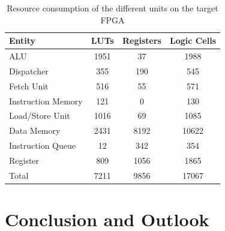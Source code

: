 \documentclass[conference]{IEEEtran}
\begin{document}
\begin{table}
	\caption{Resource consumption of the different units on the target FPGA}
	\centering
	\begin{tabular}{l c c c}
			Entity & LUTs & Registers & Logic Cells \\
		\midrule
			ALU & 1951 & 37 & 1988 \\
			Dispatcher & 355 & 190 & 545 \\
			Fetch Unit & 516 & 55 & 571 \\
			Instruction Memory & 121 & 0 & 130 \\
			Load/Store Unit & 1016 & 69 & 1085 \\
			Data Memory & 2431 & 8192 & 10622 \\
			Instruction Queue & 12 & 342 & 354 \\
			Register & 809 & 1056 & 1865 \\
		\midrule
			Total & 7211 & 9856 & 17067 \\
	\end{tabular}
	\label{tab:resources}
\end{table}



\section{Conclusion and Outlook} \label{sec:conclusion}



\cite{HP}


\printbibliography
\end{document}
